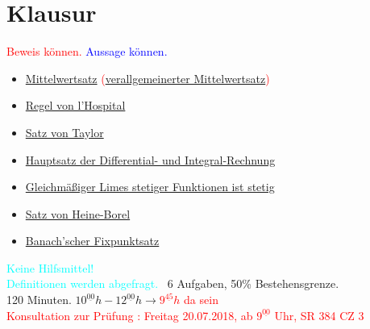 \section*{Klausur}
\textcolor{red}{Beweis können.}
\textcolor{blue}{Aussage können.}
\begin{itemize}
	\item \textcolor{red}{\hyperref[vl_07_MWS]{Mittelwertsatz} (\hyperref[satz_9]{verallgemeinerter Mittelwertsatz})}
	\item \textcolor{blue}{\hyperref[regel_von_hospital]{Regel von l'Hospital}}
	\item \textcolor{red}{\hyperref[satz_von_taylor]{Satz von Taylor}}
	\item \textcolor{red}{\hyperref[vl_12_satz_02]{Hauptsatz der Differential- und Integral-Rechnung}}
	\item \textcolor{red}{\hyperref[vl_17_satz_2]{Gleichmäßiger Limes stetiger Funktionen ist stetig}}
	\item \textcolor{blue}{\hyperref[satz_v_heine_borel]{Satz von Heine-Borel}}
	\item \textcolor{blue}{\hyperref[banachscherfixpunktsatz]{Banach'scher Fixpunktsatz}}
\end{itemize}
\textcolor{cyan}{Keine Hilfsmittel!}\\
\textcolor{cyan}{Definitionen werden abgefragt.}
~6 Aufgaben, 50\% Bestehensgrenze.\\
120 Minuten. $10^{\underline{00}}h - 12^{\underline{00}}h \rightarrow$\textcolor{red}{$9^{\underline{45}}h$ da sein}\\

\textcolor{red}{Konsultation zur Prüfung : Freitag 20.07.2018, 
ab $9^{\underline{00}}$ Uhr, SR 384 CZ 3}